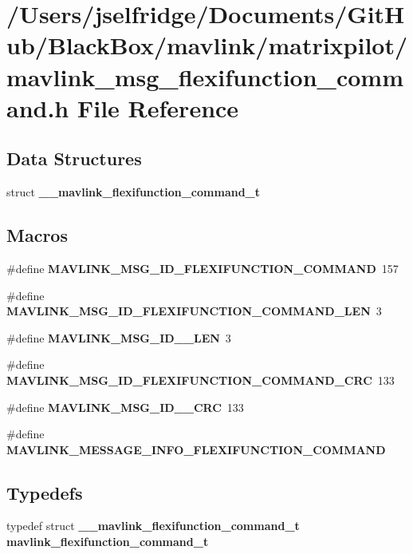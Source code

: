 \section{/\+Users/jselfridge/\+Documents/\+Git\+Hub/\+Black\+Box/mavlink/matrixpilot/mavlink\+\_\+msg\+\_\+flexifunction\+\_\+command.h File Reference}
\label{mavlink__msg__flexifunction__command_8h}
\subsection*{Data Structures}
\begin{DoxyCompactItemize}
\item 
struct \textbf{ \+\_\+\+\_\+mavlink\+\_\+flexifunction\+\_\+command\+\_\+t}
\end{DoxyCompactItemize}
\subsection*{Macros}
\begin{DoxyCompactItemize}
\item 
\#define \textbf{ M\+A\+V\+L\+I\+N\+K\+\_\+\+M\+S\+G\+\_\+\+I\+D\+\_\+\+F\+L\+E\+X\+I\+F\+U\+N\+C\+T\+I\+O\+N\+\_\+\+C\+O\+M\+M\+A\+ND}~157
\item 
\#define \textbf{ M\+A\+V\+L\+I\+N\+K\+\_\+\+M\+S\+G\+\_\+\+I\+D\+\_\+\+F\+L\+E\+X\+I\+F\+U\+N\+C\+T\+I\+O\+N\+\_\+\+C\+O\+M\+M\+A\+N\+D\+\_\+\+L\+EN}~3
\item 
\#define \textbf{ M\+A\+V\+L\+I\+N\+K\+\_\+\+M\+S\+G\+\_\+\+I\+D\+\_\+\_\+\+L\+EN}~3
\item 
\#define \textbf{ M\+A\+V\+L\+I\+N\+K\+\_\+\+M\+S\+G\+\_\+\+I\+D\+\_\+\+F\+L\+E\+X\+I\+F\+U\+N\+C\+T\+I\+O\+N\+\_\+\+C\+O\+M\+M\+A\+N\+D\+\_\+\+C\+RC}~133
\item 
\#define \textbf{ M\+A\+V\+L\+I\+N\+K\+\_\+\+M\+S\+G\+\_\+\+I\+D\+\_\+\_\+\+C\+RC}~133
\item 
\#define \textbf{ M\+A\+V\+L\+I\+N\+K\+\_\+\+M\+E\+S\+S\+A\+G\+E\+\_\+\+I\+N\+F\+O\+\_\+\+F\+L\+E\+X\+I\+F\+U\+N\+C\+T\+I\+O\+N\+\_\+\+C\+O\+M\+M\+A\+ND}
\end{DoxyCompactItemize}
\subsection*{Typedefs}
\begin{DoxyCompactItemize}
\item 
typedef struct \textbf{ \+\_\+\+\_\+mavlink\+\_\+flexifunction\+\_\+command\+\_\+t} \textbf{ mavlink\+\_\+flexifunction\+\_\+command\+\_\+t}
\end{DoxyCompactItemize}


